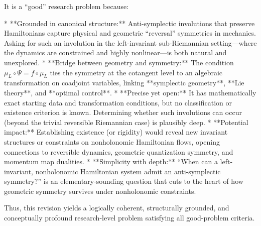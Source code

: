 It is a “good” research problem because:

* **Grounded in canonical structure:** Anti-symplectic involutions that preserve Hamiltonians capture physical and geometric “reversal” symmetries in mechanics. Asking for such an involution in the left-invariant sub-Riemannian setting—where the dynamics are constrained and highly nonlinear—is both natural and unexplored.  
* **Bridge between geometry and symmetry:** The condition \(\mu_L\circ\Psi = f\circ\mu_L\) ties the symmetry at the cotangent level to an algebraic transformation on coadjoint variables, linking **symplectic geometry**, **Lie theory**, and **optimal control**.  
* **Precise yet open:** It has mathematically exact starting data and transformation conditions, but no classification or existence criterion is known. Determining whether such involutions can occur (beyond the trivial reversible Riemannian case) is plausibly deep.  
* **Potential impact:** Establishing existence (or rigidity) would reveal new invariant structures or constraints on nonholonomic Hamiltonian flows, opening connections to reversible dynamics, geometric quantization symmetry, and momentum map dualities.  
* **Simplicity with depth:** “When can a left-invariant, nonholonomic Hamiltonian system admit an anti-symplectic symmetry?” is an elementary-sounding question that cuts to the heart of how geometric symmetry survives under nonholonomic constraints.

Thus, this revision yields a logically coherent, structurally grounded, and conceptually profound research-level problem satisfying all good-problem criteria.